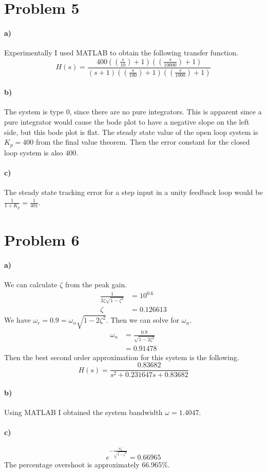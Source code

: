 \documentclass[12pt]{article}
\begin{document}
\section*{Problem 5}

\paragraph{a)}

Experimentally I used MATLAB to obtain the following transfer function.
\[H(s)=\frac{400\left(\left(\frac{s}{10}\right)+1\right)\left(\left(\frac{s}{10000}\right)+1\right)}{(s+1)\left(\left(\frac{s}{100}\right)+1\right)\left(\left(\frac{s}{1000}\right)+1\right)}\]

\paragraph{b)}

The system is type 0, since there are no pure integrators. This is apparent since a pure integrator would cause the bode plot to have a negative slope on the left side, but this
bode plot is flat. The steady state value of the open loop system is \(K_p=400\) from the final value theorem. Then the error constant for the closed loop
system is also \(400\).

\paragraph{c)}

The steady state tracking error for a step input in a unity feedback loop would be \(\frac{1}{1+K_p}=\frac{1}{401}\).

\section*{Problem 6}

\paragraph{a)}

We can calculate \(\zeta\) from the peak gain.
\begin{align*}
    \frac{1}{2\zeta\sqrt{1-\zeta^2}}&=10^{0.6}\\
    \zeta&=0.126613
\end{align*}
We have \(\omega_r=0.9=\omega_n\sqrt{1-2\zeta^2}\). Then we can solve for \(\omega_n\).
\begin{align*}
    \omega_n&=\frac{0.9}{\sqrt{1-2\zeta^2}}\\
    &=0.91478
\end{align*}
Then the best second order approximation for this system is the following.
\[H(s)=\frac{0.83682}{s^2+0.231647s+0.83682}\]

\paragraph{b)}

Using MATLAB I obtained the system bandwidth \(\omega=1.4047\).

\paragraph{c)}

\[e^{-\frac{\pi\zeta}{\sqrt{1-\zeta^2}}}=0.66965\]
The percentage overshoot is approximately 66.965\%.
\end{document}
